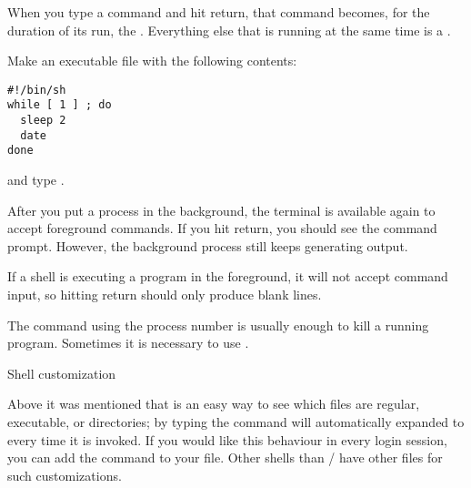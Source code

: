 When you type a command and hit return, that command becomes, for
the duration of its run, the . Everything else that is running at the same time is a
.

Make an executable file  with the following contents:
\begin{verbatim}
#!/bin/sh
while [ 1 ] ; do
  sleep 2
  date
done
\end{verbatim}
and type . 

{After you put a process in the background, the terminal is available
  again to accept foreground commands. If you hit return, you should
  see the command prompt. However, the background process still keeps
  generating output.}{}

{If a shell is executing a program in the foreground, it will not
  accept command input, so hitting return should only produce blank
  lines.}{}

{The command  using the process number is usually enough
  to kill a running program. Sometimes it is necessary to use .}{}

 {Shell customization}

Above it was mentioned that  is an easy way to see which
files are regular, executable, or directories; by typing  the  command will automatically expanded to  every time it is invoked. If you would like this behaviour in
every login session, you can add the  command to your
 file. Other shells than / have other files for such
customizations.

